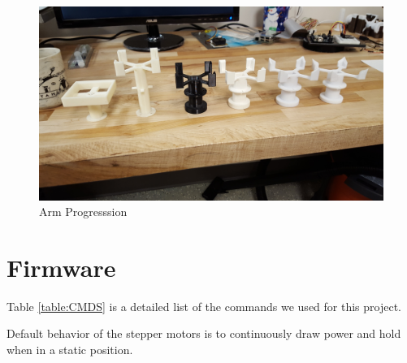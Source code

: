 \documentclass[final, letterpaper, 10 pt, conference, twocolumn]{IEEEtran}
\begin{document}
\begin{figure}[!ht]
\centering
\includegraphics[width=\linewidth]{ArmProgression.jpg}
\caption{Arm Progresssion}
\label{fig:Arm Progression}
\end{figure}


\section{Firmware}
Table \ref{table:CMDS} is a detailed list of the commands we used for this project.

Default behavior of the stepper motors is to continuously draw power and hold when in a static position.
\end{document}
